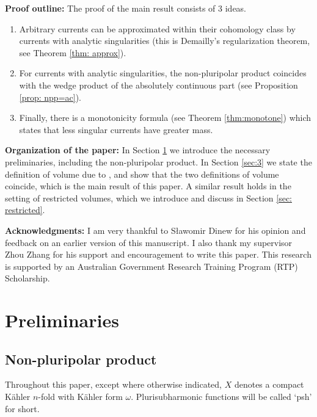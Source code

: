 \documentclass[a4paper]{amsart}
\theoremstyle{definition}
\begin{document}
\vspace*{2mm}
\noindent\textbf{Proof outline:} The proof of the main result consists of 3 ideas.
\begin{enumerate}
    \item Arbitrary currents can be approximated within their cohomology class by currents with analytic singularities (this is Demailly's regularization theorem, see Theorem \ref{thm: approx}).
    \item For currents with analytic singularities, the non-pluripolar product coincides with the wedge product of the absolutely continuous part (see Proposition \ref{prop: npp=ac}).
    \item Finally, there is a monotonicity formula (see Theorem \ref{thm:monotone}) which states that less singular currents have greater mass.
\end{enumerate}
\vspace*{2mm}
\textbf{Organization of the paper:} In Section \ref{sec:2} we introduce the necessary preliminaries, including the non-pluripolar product. In Section \ref{sec:3} we state the definition of volume due to \cite{BEGZ}, and show that the two definitions of volume coincide, which is the main result of this paper. A similar result holds in the setting of restricted volumes, which we introduce and discuss in Section \ref{sec: restricted}.

\vspace*{2mm}
\noindent\textbf{Acknowledgments:} I am very thankful to S\l awomir Dinew for his opinion and feedback on an earlier version of this manuscript. I also thank my supervisor Zhou Zhang for his support and encouragement to write this paper. This research is supported by an Australian Government Research Training Program (RTP) Scholarship.

\section{Preliminaries}\label{sec:2}
\subsection{Non-pluripolar product}
Throughout this paper, except where otherwise indicated, $X$ denotes a compact K\"ahler $n$-fold with K\"ahler form $\omega$. Plurisubharmonic functions will be called `psh' for short.
\end{document}
